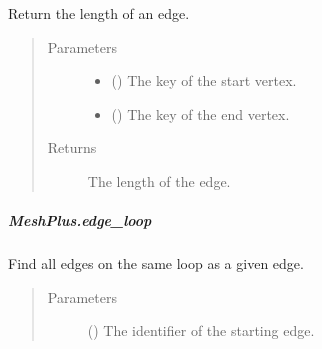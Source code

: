 \documentclass[letterpaper,10pt,english]{sphinxmanual}
\begin{document}
\begin{fulllineitems}
\begin{fulllineitems}
\label{\detokenize{api/generated/directional_clustering.mesh.MeshPlus.edge_length:directional_clustering.mesh.MeshPlus.edge_length}}
Return the length of an edge.
\begin{quote}\begin{description}
\item[{Parameters}] \leavevmode\begin{itemize}
\item {} 
 () \textendash{} The key of the start vertex.

\item {} 
 () \textendash{} The key of the end vertex.

\end{itemize}

\item[{Returns}] \leavevmode
{} \textendash{} The length of the edge.

\end{description}\end{quote}

\end{fulllineitems}



\subparagraph{MeshPlus.edge\_loop}
\label{\detokenize{api/generated/directional_clustering.mesh.MeshPlus.edge_loop:meshplus-edge-loop}}\label{\detokenize{api/generated/directional_clustering.mesh.MeshPlus.edge_loop::doc}}

\begin{fulllineitems}
\label{\detokenize{api/generated/directional_clustering.mesh.MeshPlus.edge_loop:directional_clustering.mesh.MeshPlus.edge_loop}}
Find all edges on the same loop as a given edge.
\begin{quote}\begin{description}
\item[{Parameters}] \leavevmode
{} () \textendash{} The identifier of the starting edge.


\end{description}
\end{quote}
\end{fulllineitems}
\end{fulllineitems}
\end{document}
